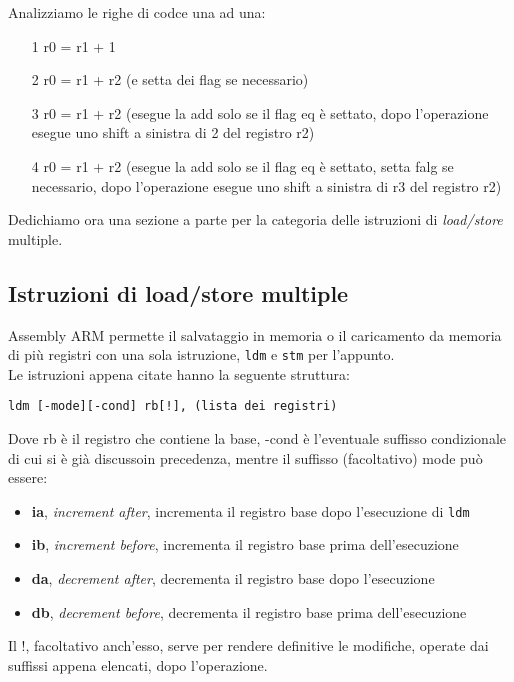 \documentclass[class=book, crop=false]{standalone}
\begin{document}
Analizziamo le righe di codce una ad una:
\begin{itemize}
	\item [1] r0 = r1 + 1
	\item [2] r0 = r1 + r2 (e setta dei flag se necessario)
	\item [3] r0 = r1 + r2 (esegue la add solo se il flag eq è settato, dopo l'operazione esegue uno shift a sinistra di 2 del registro r2)
	\item [4] r0 = r1 + r2 (esegue la add solo se il flag eq è settato, setta falg se necessario, dopo l'operazione esegue uno shift a sinistra di r3 del registro r2)
\end{itemize}

Dedichiamo ora una sezione a parte per la categoria delle istruzioni di \emph{load/store} multiple.

\subsection*{Istruzioni di load/store multiple}
Assembly ARM permette il salvataggio in memoria o il caricamento da memoria di più registri con una sola istruzione, \texttt{ldm} e \texttt{stm} per l'appunto.\\
Le istruzioni appena citate hanno la seguente struttura:

\begin{verbatim}
ldm [-mode][-cond] rb[!], (lista dei registri)
\end{verbatim}

Dove rb è il registro che contiene la base, -cond è l'eventuale suffisso condizionale di cui si è già discussoin precedenza, mentre il suffisso (facoltativo) mode può essere:

\begin{itemize}[nolistsep]
	\item \textbf{ia}, \emph{increment after}, incrementa il registro base dopo l'esecuzione di \texttt{ldm}
	\item \textbf{ib}, \emph{increment before}, incrementa il registro base prima dell'esecuzione
	\item \textbf{da}, \emph{decrement after}, decrementa il registro base dopo l'esecuzione
	\item \textbf{db}, \emph{decrement before}, decrementa il registro base prima dell'esecuzione
\end{itemize}

Il !, facoltativo anch'esso, serve per rendere definitive le modifiche, operate dai suffissi appena elencati, dopo l'operazione.
\end{document}
